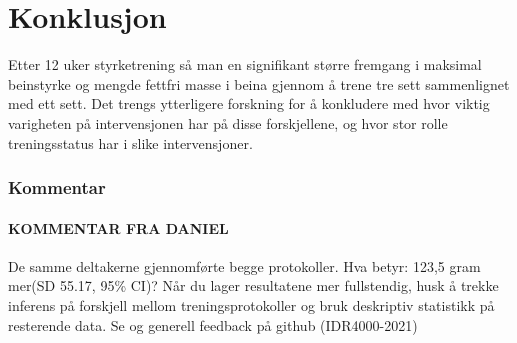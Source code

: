 \documentclass[
]{book}
\begin{document}
\hypertarget{konklusjon}{%
\section{Konklusjon}\label{konklusjon}}

Etter 12 uker styrketrening så man en signifikant større fremgang i maksimal beinstyrke og mengde fettfri masse i beina gjennom å trene tre sett sammenlignet med ett sett. Det trengs ytterligere forskning for å konkludere med hvor viktig varigheten på intervensjonen har på disse forskjellene, og hvor stor rolle treningsstatus har i slike intervensjoner.

\hypertarget{kommentar}{%
\subsubsection{Kommentar}\label{kommentar}}

\hypertarget{kommentar-fra-daniel}{%
\paragraph{KOMMENTAR FRA DANIEL}\label{kommentar-fra-daniel}}

De samme deltakerne gjennomførte begge protokoller. Hva betyr: 123,5 gram mer(SD 55.17, 95\% CI)? Når du lager resultatene mer fullstendig, husk å trekke inferens på forskjell mellom treningsprotokoller og bruk deskriptiv statistikk på resterende data. Se og generell feedback på github (IDR4000-2021)

  
\end{document}
